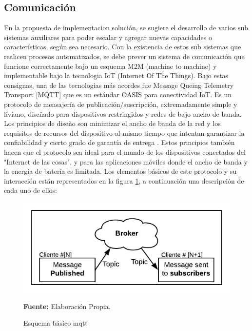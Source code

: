 \subsection{Comunicaci\'on}
En la propuesta de implementacion soluci\'on, se sugiere el desarrollo de varios sub sistemas auxiliares para poder escalar y agregar nuevas capacidades o caracter\'isticas, seg\'un sea necesario.
Con la existencia de estos sub sistemas que realicen procesos automatizados, se debe prever un sistema de comunicaci\'on que funcione correctamente bajo un esquema M2M (machine to machine) y implementable bajo la tecnologia IoT (Internet Of The Things). 
Bajo estas consignas, una de las tecnologias m\'as acordes fue Message Queing Telemetry Transport [MQTT] que es un est\'andar OASIS para conectividad IoT. Es un protocolo de mensajer\'ia de publicaci\'on/suscripci\'on, extremadamente simple y liviano, dise\~nado para dispositivos restringidos y redes de bajo ancho de banda. Los principios de dise\~no son minimizar el ancho de banda de la red y los requisitos de recursos del dispositivo al mismo tiempo que intentan garantizar la confiabilidad y cierto grado de garant\'ia de entrega \cite{mqtt-no-date}. Estos principios tambi\'en hacen que el protocolo sea ideal para el mundo de los dispositivos conectados del "Internet de las cosas", y para las aplicaciones m\'oviles donde el ancho de banda y la energ\'ia de bater\'ia es limitada.
Los elementos b\'asicos de este protocolo y su interacci\'on est\'an representados en la figura  \ref{fig:mqtt}, a continuaci\'on una descripci\'on de cada uno de ellos:
  \begin{figure}[ht]
        \centering
        \includegraphics[scale=0.6]{Imagenes/cap3/Esquema Mqtt.png}
        \caption[mqtt]{Esquema b\'asico mqtt}\textbf{Fuente:} Elaboración Propia.
        \label{fig:mqtt}
    \end{figure}
